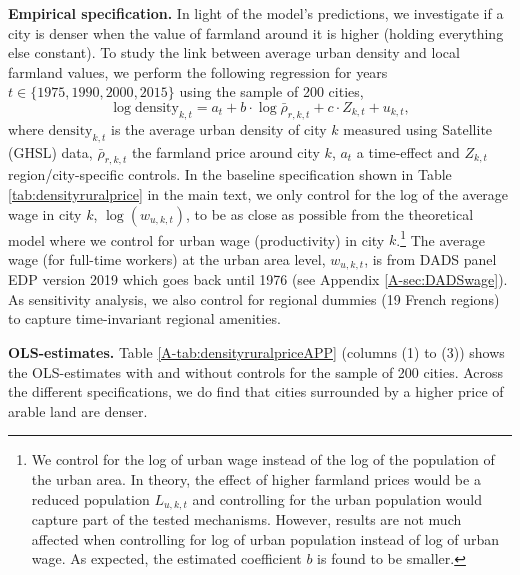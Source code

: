 \documentclass[11pt]{report}
\begin{document}
\noindent \textbf{Empirical specification.} In light of the model's predictions, we investigate if a city is denser when the value of farmland around it is higher (holding everything else constant). To study the link between average urban density and local farmland values, we perform the following regression for years $t \in \{1975, 1990, 2000, 2015\}$ using the sample of 200 cities,
\begin{equation}
\log \text{density}_{k,t} = a_t + b \cdot \log \bar{\rho}_{r,k,t}+ c \cdot Z_{k,t} + u_{k,t},
\label{A-reg:densityruralpriceapp}
\end{equation}
where $\text{density}_{k,t}$ is the average urban density of city $k$ measured using Satellite (GHSL) data, $\bar{\rho}_{r,k,t}$ the farmland price around city $k$, $a_t$ a time-effect and $Z_{k,t}$ region/city-specific controls. 
In the baseline specification shown in Table \ref{tab:densityruralprice} in the main text, we only control for the log of the average wage in city $k$,  $\log(w_{u,k,t})$, to be as close as possible from the theoretical model where we control for urban wage (productivity) in city $k$.\footnote{We control for the log of urban wage instead of the log of the population of the urban area. In theory, the effect of higher farmland prices would be a reduced population $L_{u,k,t}$ and controlling for the urban population would capture part of the tested mechanisms. However, results are not much affected when controlling for log of urban population instead of log of urban wage. As expected, the estimated coefficient $b$ is found to be smaller.} The average wage (for full-time workers) at the urban area level, $w_{u,k,t}$, is from DADS panel EDP version 2019 which goes back until 1976 (see Appendix \ref{A-sec:DADSwage}). As sensitivity analysis, we also control for regional dummies (19 French regions) to capture time-invariant regional amenities.

\noindent \textbf{OLS-estimates.} Table \ref{A-tab:densityruralpriceAPP} (columns (1) to (3)) shows the OLS-estimates with and without controls for the sample of 200 cities. Across the different specifications, we do find that cities surrounded by a higher price of arable land are denser. 
\end{document}
